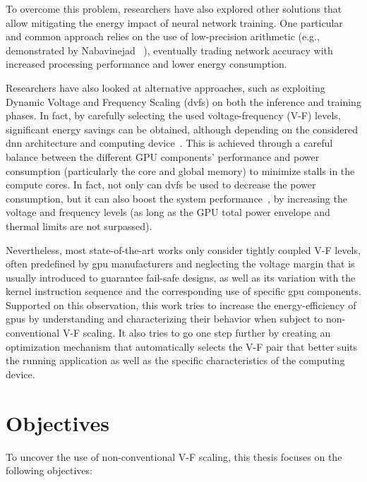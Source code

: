 To overcome this problem, researchers have also explored other solutions that allow mitigating the energy impact of neural network training. One particular and common approach relies on the use of low-precision arithmetic (e.g., demonstrated by Nabavinejad~ \cite{nabavinejad_coordinated_2019}), eventually trading network accuracy with increased processing performance and lower energy consumption.

Researchers have also looked at alternative approaches, such as exploiting Dynamic Voltage and Frequency Scaling (\acrshort{dvfs}) on both the inference and training phases. In fact, by carefully selecting the used voltage-frequency (V-F) levels, significant energy savings can be obtained, although depending on the considered \acrshort{dnn} architecture and computing  device~\cite{tang_impact_2019}. This is achieved through a careful balance between the different GPU components' performance and power consumption (particularly the core and global memory) to minimize stalls in the compute cores. In fact, not only can \acrshort{dvfs} be used to decrease the power consumption, but it can also boost the system performance~\cite{tang_impact_2019}, by increasing the voltage and frequency levels (as long as the GPU total power envelope and thermal limits are not surpassed).

Nevertheless, most state-of-the-art works only consider tightly coupled V-F levels, often predefined by \acrshort{gpu} manufacturers and neglecting the voltage margin that is usually introduced to guarantee fail-safe designs, as well as its variation with the kernel instruction sequence and the corresponding use of specific \acrshort{gpu} components. Supported on this observation, this work tries to increase the energy-efficiency of \acrshort{gpu}s by understanding and characterizing their behavior when subject to non-conventional V-F scaling. 
It also tries to go one step further by creating an optimization mechanism that automatically selects the V-F pair that better suits the running application as well as the specific characteristics of the computing device.


\section{Objectives}
\label{section:objectives}

To uncover the use of non-conventional V-F scaling, this thesis focuses on the following objectives:

